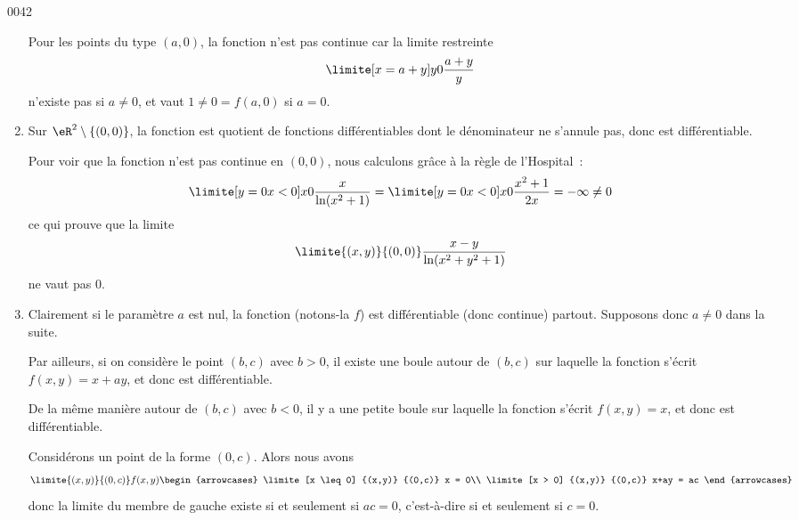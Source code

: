 \begin{corrige}{0042}
\begin{enumerate}
  Pour les points du type $(a,0)$, la fonction n'est pas continue car
  la limite restreinte
  \begin{equation*}
    \limite[x = a + y] y 0 \frac{a+y}{y}
  \end{equation*}
  n'existe pas si $a \neq 0$, et vaut $1 \neq 0 = f(a,0)$ si $a = 0$.

\item Sur $\eR^2\setminus\{(0,0)\}$, la fonction est quotient de
  fonctions différentiables dont le dénominateur ne s'annule pas, donc
  est différentiable.

Pour voir que la fonction n'est pas continue en $(0,0)$, nous
calculons grâce à la règle de l'Hospital~:
\begin{equation*}
  \limite[y = 0\\x < 0] x 0 \frac{x}{\ln(x^2+1)} =   \limite[y = 0\\x <
  0] x 0 \frac{x^2+1}{2x} = -\infty \neq 0
\end{equation*}
ce qui prouve que la limite
\begin{equation*}
  \limite {(x,y)} {(0,0)} \frac{x-y}{\ln(x^2+y^2+1)}
\end{equation*}
ne vaut pas $0$.

\item Clairement si le paramètre $a$ est nul, la fonction (notons-la
  $f$) est différentiable (donc continue) partout. Supposons donc $a
  \neq 0$ dans la suite.

  Par ailleurs, si on considère le point $(b,c)$ avec $b > 0$, il
  existe une boule autour de $(b,c)$ sur laquelle la fonction s'écrit
  $f(x,y) = x + a y$, et donc est différentiable.

  De la même manière autour de $(b,c)$ avec $b < 0$, il y a une petite
  boule sur laquelle la fonction s'écrit $f(x,y) = x$, et donc est
  différentiable.

   Considérons un point de la forme $(0,c)$. Alors nous avons
   \begin{equation*}
     \limite{(x,y)} {(0,c)} f(x,y)   \begin{arrowcases}
       \limite[x \leq 0] {(x,y)} {(0,c)} x = 0\\
       \limite[x > 0] {(x,y)} {(0,c)} x+ay = ac
     \end{arrowcases}
   \end{equation*}
   donc la limite du membre de gauche existe si et seulement si $ac =
   0$, c'est-à-dire si et seulement si $c = 0$.


\end{enumerate}
\end{corrige}
